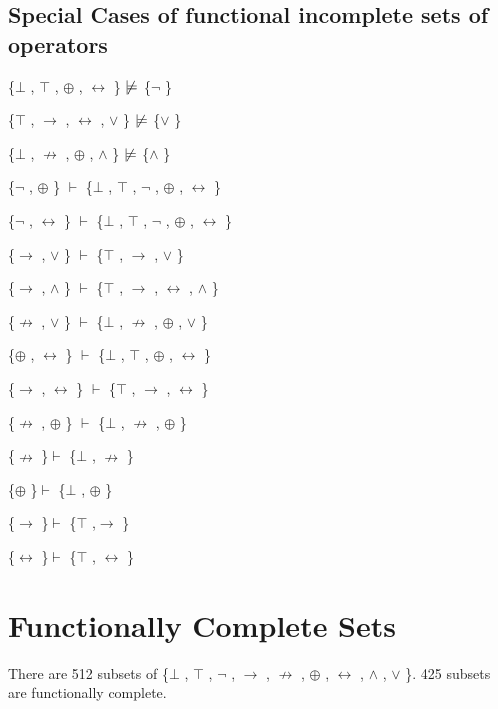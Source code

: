 \hypertarget{special-cases-of-functional-incomplete-sets-of-operators}{%
\subsection{Special Cases of functional incomplete sets of
operators}\label{special-cases-of-functional-incomplete-sets-of-operators}}

\{$\bot$ , $\top$ , $\oplus$ , $\leftrightarrow$ \} $\nmodels$  \{$\neg$ \}

\{$\top$ , $\to$ , $\leftrightarrow$ , $\lor$ \} $\nmodels$  \{$\lor$ \}

\{$\bot$ , $\nrightarrow$ , $\oplus$ , $\land$ \} $\nmodels$  \{$\land$ \}

\{$\neg$ , $\oplus$ \} $\vdash$  \{$\bot$ , $\top$ , $\neg$ , $\oplus$ , $\leftrightarrow$ \}

\{$\neg$ , $\leftrightarrow$ \} $\vdash$  \{$\bot$ , $\top$ , $\neg$ , $\oplus$ , $\leftrightarrow$ \}

\{$\to$ , $\lor$ \} $\vdash$  \{$\top$ , $\to$ , $\lor$ \}

\{$\to$ , $\land$ \} $\vdash$  \{$\top$ , $\to$ , $\leftrightarrow$ , $\land$ \}

\{$\nrightarrow$ , $\lor$ \} $\vdash$  \{$\bot$ , $\nrightarrow$ , $\oplus$ , $\lor$ \}

\{$\oplus$ , $\leftrightarrow$ \} $\vdash$  \{$\bot$ , $\top$ , $\oplus$ , $\leftrightarrow$ \}

\{$\to$ , $\leftrightarrow$ \} $\vdash$  \{$\top$ , $\to$ , $\leftrightarrow$ \}

\{$\nrightarrow$ , $\oplus$ \} $\vdash$  \{$\bot$ , $\nrightarrow$ , $\oplus$ \}

\{$\nrightarrow$ \}$\vdash$ \{$\bot$ , $\nrightarrow$ \}

\{$\oplus$ \}$\vdash$ \{$\bot$ , $\oplus$ \}

\{$\to$ \}$\vdash$ \{$\top$ ,$\to$ \}

\{$\leftrightarrow$ \}$\vdash$ \{$\top$ , $\leftrightarrow$ \}

\hypertarget{functionally-complete-sets}{%
\section{Functionally Complete Sets}\label{functionally-complete-sets}}

There are 512 subsets of \{$\bot$ , $\top$ , $\neg$ , $\to$ , $\nrightarrow$ , $\oplus$ , $\leftrightarrow$ , $\land$ , $\lor$ \}. 425 subsets are
functionally complete.

